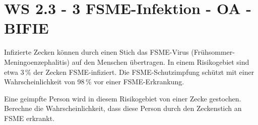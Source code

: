 \section{WS 2.3 - 3 FSME-Infektion - OA - BIFIE}

\begin{beispiel}[WS 2.3]{1}
Infizierte Zecken können durch einen Stich das FSME-Virus (Frühsommer-Meningoenzephalitis) auf den Menschen übertragen. In einem Risikogebiet sind etwa 3\,\% der Zecken FSME-infiziert. Die FSME-Schutzimpfung schützt mit einer Wahrscheinlichkeit von 98\,\% vor einer FSME-Erkrankung. \leer

Eine geimpfte Person wird in diesem Risikogebiet von einer Zecke gestochen. Berechne die Wahrscheinlichkeit, dass diese Person durch den Zeckenstich an FSME erkrankt.

\end{beispiel}